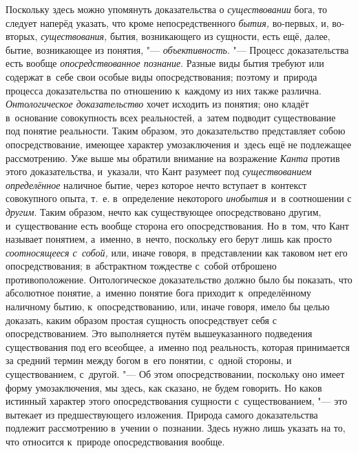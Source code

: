 Поскольку здесь можно упомянуть доказательства о
{\em существовании} бога, то следует наперёд указать,
что кроме непосредственного {\em бытия,} во-первых, и,
во-вторых, {\em существования,} бытия, возникающего из
сущности, есть ещё, далее, бытие, возникающее из понятия, "---
{\em объективность}. "--- Процесс доказательства есть
вообще {\em опосредствованное познание}. Разные виды
бытия требуют или содержат в~себе свои особые виды опосредствования;
поэтому и~природа процесса доказательства по отношению к~каждому из них
также различна. {\em Онтологическое доказательство}
хочет исходить из понятия; оно кладёт в~основание совокупность всех
реальностей, а~затем подводит существование под понятие реальности. Таким
образом, это доказательство представляет собою опосредствование, имеющее
характер умозаключения и~здесь ещё не подлежащее рассмотрению. Уже
выше
мы обратили внимание на возражение {\em Канта} против
этого доказательства, и~указали, что Кант разумеет под
{\em существованием определённое} наличное бытие, через
которое нечто вступает в~контекст совокупного опыта, т.~е. в~определение
некоторого {\em инобытия} и~в соотношении с
{\em другим}. Таким образом, нечто как существующее
опосредствовано другим, и~существование есть вообще сторона его
опосредствования. Но в~том, что Кант называет понятием, а~именно, в~нечто,
поскольку его берут лишь как просто {\em соотносящееся
с~собой,} или, иначе говоря, в~представлении как таковом нет его
опосредствования; в~абстрактном тождестве с~собой отброшено
противоположение. Онтологическое доказательство должно было бы показать,
что абсолютное понятие, а~именно понятие бога приходит к~определённому
наличному бытию, к~опосредствованию, или, иначе говоря, имело бы целью
доказать, каким образом простая сущность опосредствует себя с
опосредствованием. Это выполняется путём вышеуказанного подведения
существования под его всеобщее, а~именно под реальность, которая
принимается за средний термин между богом в~его понятии, с~одной стороны, и
существованием, с~другой. "--- Об этом опосредствовании, поскольку оно имеет
форму умозаключения, мы здесь, как сказано, не будем говорить. Но каков
истинный характер этого опосредствования сущности с~существованием, "--- это
вытекает из предшествующего изложения. Природа самого доказательства
подлежит рассмотрению в~учении о~познании. Здесь нужно лишь указать на то,
что относится к~природе опосредствования вообще.

